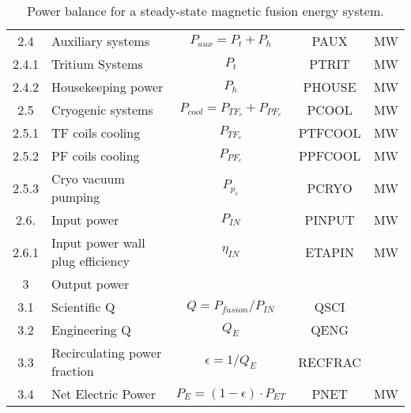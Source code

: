 \begin{table}[ht!]
\begin{tabular}{|c|p{5cm}|c|c|c|}
2.4	&	Auxiliary systems	&	$P_{{aux}} = P_{{t}} + P_{{h}}$	&	PAUX	&	MW \\
2.4.1	&	Tritium Systems	&	$P_{{t}}$	&	PTRIT	&	MW \\
2.4.2	&	Housekeeping power	&	$P_{{h}}$	&	PHOUSE	&	MW \\
2.5	&	Cryogenic systems	&	$P_{{cool}} = P_{{TF}_c} + P_{{PF}_c}$	&	PCOOL	&	MW \\
2.5.1	&	TF coils cooling	&	$P_{{TF}_c}$	&	PTFCOOL	&	MW \\
2.5.2	&	PF coils cooling	&	$P_{{PF}_c}$	&	PPFCOOL	&	MW \\
2.5.3	&	Cryo vacuum pumping	&	$P_{{p}_c}$	&	PCRYO	&	MW \\
2.6.	& Input power 	& $P_{IN}$	&	PINPUT	&	MW \\
2.6.1	& Input power wall plug efficiency  &	$\eta_{IN}$ & ETAPIN	&	MW \\
\hline								
3	&	Output power	&		&		&	\\
\hline
3.1	&	Scientific Q	&	$Q = P_{{fusion}}/P_{{IN}}$	&	QSCI	&	\\
3.2	&	Engineering Q	&	$Q_{{E}}$	&	QENG	&	\\
3.3	&	Recirculating power fraction	&	$\epsilon = 1/Q_{{E}}$	&	RECFRAC	&	\\
3.4	&	Net Electric Power	&	$P_{{E}} = (1 - \epsilon) \cdot P_{{ET}}$	&	PNET	&	MW \\
\hline								
\end{tabular}	
\caption{Power balance for a steady-state magnetic fusion energy system.}
\label{tab:powerbalance}
\end{table}





